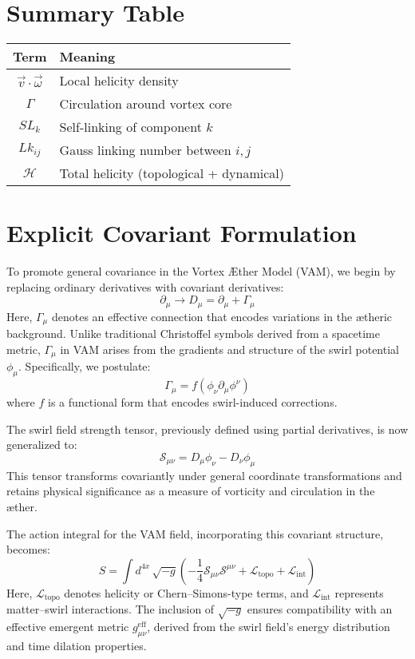 \section*{Summary Table}
\begin{tabular}{|c|l|}
    \hline
    \textbf{Term} & \textbf{Meaning} \\
    \hline
    $\vec{v} \cdot \vec{\omega}$ & Local helicity density \\
    $\Gamma$ & Circulation around vortex core \\
    $SL_k$ & Self-linking of component $k$ \\
    $Lk_{ij}$ & Gauss linking number between $i,j$ \\
    $\mathcal{H}$ & Total helicity (topological + dynamical) \\
    \hline
\end{tabular}



\section{Explicit Covariant Formulation}
To promote general covariance in the Vortex \AE{}ther Model (VAM), we begin by replacing ordinary derivatives with covariant derivatives:
\begin{equation}
    \partial_\mu \rightarrow D_\mu = \partial_\mu + \Gamma_\mu
\end{equation}
Here, $\Gamma_\mu$ denotes an effective connection that encodes variations in the ætheric background. Unlike traditional Christoffel symbols derived from a spacetime metric, $\Gamma_\mu$ in VAM arises from the gradients and structure of the swirl potential $\phi_\mu$. Specifically, we postulate:
\begin{equation}
    \Gamma_\mu = f(\phi_\nu \partial_\mu \phi^\nu)
\end{equation}
where $f$ is a functional form that encodes swirl-induced corrections.

The swirl field strength tensor, previously defined using partial derivatives, is now generalized to:
\begin{equation}
    \mathcal{S}_{\mu\nu} = D_\mu \phi_\nu - D_\nu \phi_\mu
\end{equation}
This tensor transforms covariantly under general coordinate transformations and retains physical significance as a measure of vorticity and circulation in the æther.

The action integral for the VAM field, incorporating this covariant structure, becomes:
\begin{equation}
    S = \int d^{4x} \, \sqrt{-g} \left( -\frac{1}{4} \mathcal{S}_{\mu\nu} \mathcal{S}^{\mu\nu} + \mathcal{L}_{\text{topo}} + \mathcal{L}_{\text{int}} \right)
\end{equation}
Here, $\mathcal{L}_{\text{topo}}$ denotes helicity or Chern–Simons-type terms, and $\mathcal{L}_{\text{int}}$ represents matter–swirl interactions. The inclusion of $\sqrt{-g}$ ensures compatibility with an effective emergent metric $g_{\mu\nu}^{\text{eff}}$, derived from the swirl field's energy distribution and time dilation properties.


